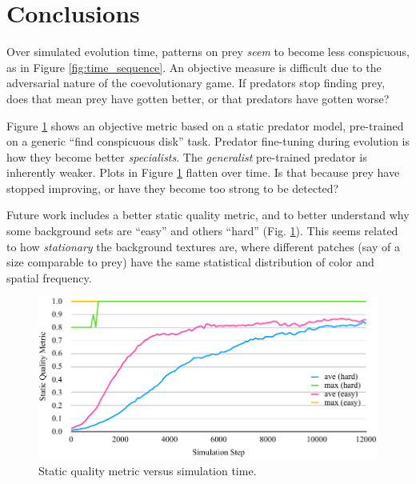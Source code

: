 \documentclass[sigconf]{acmart}
\newcommand{\jargon}[1]{\textit{#1}}
\begin{document}

\section{Conclusions}

Over simulated evolution time, patterns on prey \textit{seem} to become less conspicuous, as in Figure \ref{fig:time_sequence}. An objective measure is difficult due to the adversarial nature of the coevolutionary game. If predators stop finding prey, does that mean prey have gotten better, or that predators have gotten worse?
\par
Figure \ref{fig:sqm_plot} shows an objective metric based on a static predator model, pre-trained on a generic “find conspicuous disk” task. Predator fine-tuning during evolution is how they become better \jargon{specialists}. The \jargon{generalist} pre-trained predator is inherently weaker. Plots in Figure \ref{fig:sqm_plot} flatten over time. Is that because prey have stopped improving, or have they become too strong to be detected?
\par

Future work includes a better static quality metric, and to better understand why some background sets are “easy” and others “hard” (Fig. \ref{fig:sqm_plot}). This seems related to how \jargon{stationary} the background textures are, where different patches (say of a size comparable to prey) have the same statistical distribution of color and spatial frequency.
\par


\begin{figure}[b]
    \includegraphics[width=\columnwidth]{SQM_plot_easy_vs_hard.pdf}
    \caption{Static quality metric versus simulation time.}
    \label{fig:sqm_plot}
\end{figure}




\end{document}
